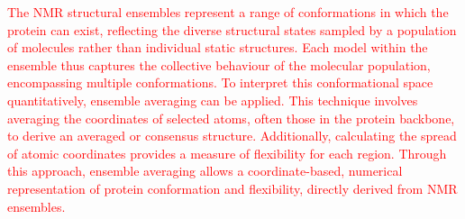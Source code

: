 \textcolor{red}{The NMR structural ensembles represent a range of conformations in which the protein can exist, reflecting the diverse structural states sampled by a population of molecules rather than individual static structures. Each model within the ensemble thus captures the collective behaviour of the molecular population, encompassing multiple conformations. To interpret this conformational space quantitatively, ensemble averaging \cite{sutcliffe_representing_1993} can be applied. This technique involves averaging the coordinates of selected atoms, often those in the protein backbone, to derive an averaged or consensus structure. Additionally, calculating the spread of atomic coordinates provides a measure of flexibility for each region. Through this approach, ensemble averaging allows a coordinate-based, numerical representation of protein conformation and flexibility, directly derived from NMR ensembles.}


